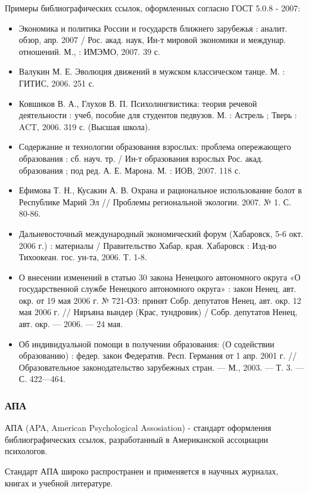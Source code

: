 Примеры библиографических ссылок, оформленных согласно ГОСТ 5.0.8 - 2007:
\begin{itemize}
	\item Экономика и политика России и государств ближнего зарубежья : аналит. обзор, апр. 2007 / Рос. акад. наук, Ин-т мировой экономики и междунар. отношений. М., : ИМЭМО, 2007. 39 с.
	\item Валукин М. Е. Эволюция движений в мужском классическом танце. М. : ГИТИС, 2006. 251 с.
	\item Ковшиков В. А., Глухов В. П. Психолингвистика: теория речевой деятельности : учеб, пособие для студентов педвузов. М. : Астрель ; Тверь : ACT, 2006. 319 с. (Высшая школа).
	\item Содержание и технологии образования взрослых: проблема опережающего образования : сб. науч. тр. / Ин-т образования взрослых Рос. акад. образования ; под ред. А. Е. Марона. М. : ИОВ, 2007. 118 с.
	\item Ефимова Т. Н., Кусакин А. В. Охрана и рациональное использование болот в Республике Марий Эл // Проблемы региональной экологии. 2007. № 1. С. 80-86.
	\item Дальневосточный международный экономический форум (Хабаровск, 5-6 окт. 2006 г.) : материалы / Правительство Хабар, края. Хабаровск : Изд-во Тихоокеан. гос. ун-та, 2006. Т. 1-8.
	\item О внесении изменений в статью 30 закона Ненецкого автономного округа «О государственной службе Ненецкого автономного округа» : закон Ненец, авт. окр. от 19 мая 2006 г. № 721-ОЗ: принят Собр. депутатов Ненец, авт. окр. 12 мая 2006 г. // Няръяна вындер (Крас, тундровик) / Собр. депутатов Ненец, авт. окр. — 2006. — 24 мая.
	\item Об индивидуальной помощи в получении образования: (О содействии образованию) : федер. закон Федератив. Респ. Германия от 1 апр. 2001 г. // Образовательное законодательство зарубежных стран. — М., 2003. — Т. 3. — С. 422—464.
\end{itemize}

\subsubsection*{АПА}

АПА (APA, American Psychological Assosiation) - стандарт оформления библиографических ссылок, разработанный в Американской ассоциации психологов.

Стандарт АПА широко распространен и применяется в научных журналах, книгах и учебной литературе.

